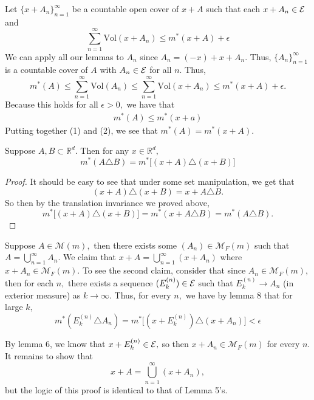 \documentclass[11pt]{article}
\newcommand{\Vol}{\text{Vol}}
\newcommand{\bbR}{\mathbb{R}}
\begin{document}
\begin{solution}
Let $\{x + A_n\}_{n=1}^\infty$ be a countable open cover of $x + A$ such that each $x + A_n \in \cal E$ and 
\[\sum_{n=1}^\infty \Vol(x + A_n) \leq m^*(x + A) + \epsilon\]
We can apply all our lemmas to $A_n$ since $A_n = (-x) + x + A_n.$ Thus, $\{A_n\}_{n=1}^\infty$ is a countable cover of $A$ with $A_n \in \cal E$ for all $n.$  Thus, 
\[m^*(A) \leq \sum_{n=1}^\infty \Vol(A_n) \leq \sum_{n=1}^\infty \Vol(x + A_n) \leq m^*(x + A) + \epsilon.\] Because this holds for all $\epsilon>0,$ we have that 
\begin{align}
    m^*(A) \leq m^*(x + a)
\end{align}
Putting together (1) and (2), we see that $m^*(A) = m^*(x + A).$

\begin{lemma}
    Suppose $A, B \subset \bbR^d.$ Then for any $x\in \bbR^d,$ 
    \[m^*(A \triangle B) = m^*\big[(x + A)\triangle (x + B)\big]\]
\end{lemma}
\begin{proof}
    It should be easy to see that under some set manipulation, we get that 
    \[(x + A)\triangle (x + B) = x + A\triangle B.\] So then by the translation invariance we proved above, 
    \[m^*\big[(x + A)\triangle (x + B)\big] = m^*(x + A\triangle B) = m^*(A\triangle B).\]
\end{proof}

Suppose $A \in \mathcal{M}(m),$ then there exists some $(A_n)\in \mathcal{M}_F(m)$ such that $A = \bigcup_{n=1}^\infty A_n$. We claim that $x + A = \bigcup_{n=1}^\infty (x + A_n)$ where $x + A_n \in \mathcal{M}_F(m).$ To see the second claim, consider that since $A_n \in \mathcal{M}_F(m),$ then for each $n,$ there exists a sequence $(E^{(n)}_k) \in \cal E$ such that $E^{(n)}_k \to A_n$ (in exterior measure) as $k\to \infty.$ Thus, for every $n,$ we have by lemma 8 that for large $k,$ 
\[m^*(E^{(n)}_k \triangle A_n) = m^*\big[(x + E^{(n)}_k) \triangle (x + A_n)\big] < \epsilon\]

By lemma 6, we know that $x + E_k^{(n)} \in \cal E,$ so then $x + A_n \in \mathcal{M}_F(m)$ for every $n.$ It remains to show that 
\[x + A = \bigcup_{n=1}^\infty (x + A_n),\] but the logic of this proof is identical to that of Lemma 5's.
\end{solution}

\newpage
\end{document}
